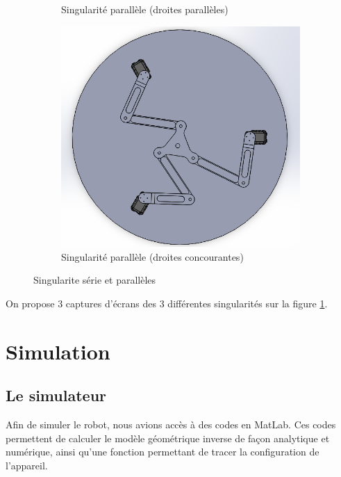 \documentclass[a4paper, 11pt]{report}
\begin{document}
\begin{figure}[!tbh]
\begin{subfigure}[t]{0.48\textwidth}
        \caption{Singularité parallèle (droites parallèles)}
    \end{subfigure}
    \begin{subfigure}[t]{0.48\textwidth}
        \centering
        \includegraphics[width=\textwidth]{Figures/singularite parallele concourante.png}
        \caption{Singularité parallèle (droites concourantes)}
    \end{subfigure}
    \caption{Singularite série et parallèles}
    \label{fig:singularity}
\end{figure}

On propose 3 captures d'écrans des 3 différentes singularités sur la figure \ref{fig:singularity}.

\section{Simulation}
\subsection{Le simulateur}
Afin de simuler le robot, nous avions accès à des codes en MatLab. Ces codes permettent de calculer le modèle géométrique inverse de façon analytique et numérique, ainsi qu'une fonction permettant de tracer la configuration de l'appareil.
\end{document}
